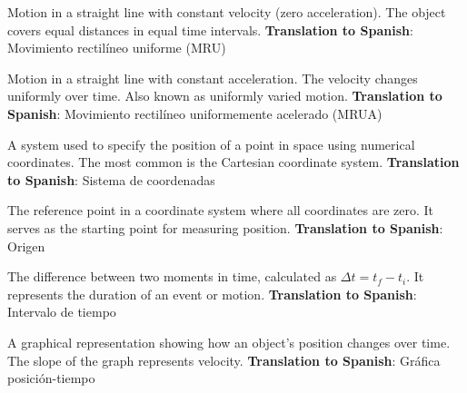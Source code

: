 \begin{vocabulary}
Motion in a straight line with constant velocity (zero acceleration). The object covers equal distances in equal time intervals. \newline
\textbf{Translation to Spanish}: Movimiento rectilíneo uniforme (MRU) \newline
\end{vocabulary}

\begin{vocabulary}
Motion in a straight line with constant acceleration. The velocity changes uniformly over time. Also known as uniformly varied motion. \newline
\textbf{Translation to Spanish}: Movimiento rectilíneo uniformemente acelerado (MRUA) \newline
\end{vocabulary}

\begin{vocabulary}
A system used to specify the position of a point in space using numerical coordinates. The most common is the Cartesian coordinate system. \newline
\textbf{Translation to Spanish}: Sistema de coordenadas \newline
\end{vocabulary}

\begin{vocabulary}[Origin]
The reference point in a coordinate system where all coordinates are zero. It serves as the starting point for measuring position. \newline
\textbf{Translation to Spanish}: Origen \newline
\end{vocabulary}

\begin{vocabulary}
The difference between two moments in time, calculated as \( \Delta t = t_f - t_i \). It represents the duration of an event or motion. \newline
\textbf{Translation to Spanish}: Intervalo de tiempo \newline
\end{vocabulary}

\begin{vocabulary}
A graphical representation showing how an object's position changes over time. The slope of the graph represents velocity. \newline
\textbf{Translation to Spanish}: Gráfica posición-tiempo \newline
\end{vocabulary}

